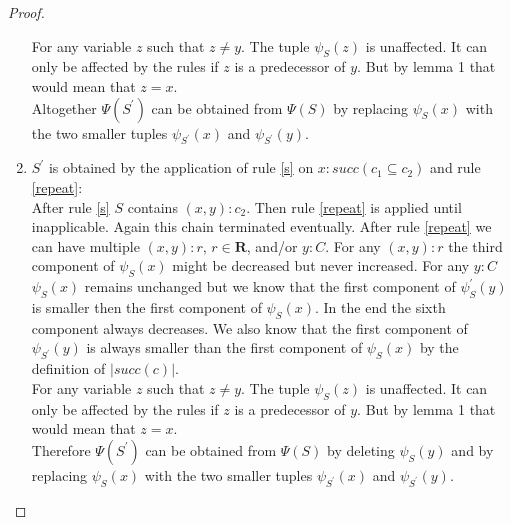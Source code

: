 \documentclass[a4paper,11pt]{scrartcl}
\theoremstyle{break}
\theoremstyle{definition}
\begin{document}
\begin{proof}
\begin{enumerate}
For any variable $z$ such that $z\neq y$. The tuple $\psi_S(z)$ is unaffected. It can only be affected by the rules if $z$ is a predecessor of $y$. But by lemma 1 that would mean that $z=x$.\\
Altogether $\Psi(S^\prime)$ can be obtained from $\Psi(S)$ by replacing $\psi_S(x)$ with the two smaller tuples $\psi_{S^\prime}(x)$ and $\psi_{S^\prime}(y)$.
\item $S^\prime$ is obtained by the application of rule \ref{s} on $x:succ(c_1\subseteq c_2)$ and rule \ref{repeat}:\\ 
After rule \ref{s} $S$ contains $(x,y):c_2$. Then rule \ref{repeat} is applied until inapplicable. Again this chain terminated eventually. After rule \ref{repeat} we can have multiple $(x,y):r$, $r\in\mathbf{R}$, and/or $y:C$. For any $(x,y):r$ the third component of $\psi_S(x)$ might be decreased but never increased. For any $y:C$ $\psi_S(x)$ remains unchanged but we know that the first component of $\psi_S^\prime(y)$ is smaller then the first component of $\psi_S(x)$. In the end the sixth component always decreases. We also know that the first component of $\psi_{S^\prime}(y)$ is always smaller than the first component of $\psi_S(x)$ by the definition of $|succ(c)|$.\\
For any variable $z$ such that $z\neq y$. The tuple $\psi_S(z)$ is unaffected. It can only be affected by the rules if $z$ is a predecessor of $y$. But by lemma 1 that would mean that $z=x$.\\
Therefore $\Psi(S^\prime)$ can be obtained from $\Psi(S)$ by deleting $\psi_S(y)$ and by replacing $\psi_S(x)$ with the two smaller tuples $\psi_{S^\prime}(x)$ and $\psi_{S^\prime}(y)$.
\end{enumerate}
\end{proof}
\end{document}
